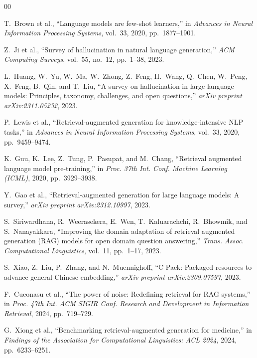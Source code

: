 \documentclass[conference]{IEEEtran}
\begin{document}
\begin{thebibliography}{00}

 T.~Brown et al., ``Language models are few-shot learners,'' in \textit{Advances in Neural Information Processing Systems}, vol.~33, 2020, pp.~1877--1901.

 Z.~Ji et al., ``Survey of hallucination in natural language generation,'' \textit{ACM Computing Surveys}, vol.~55, no.~12, pp.~1--38, 2023.

 L.~Huang, W.~Yu, W.~Ma, W.~Zhong, Z.~Feng, H.~Wang, Q.~Chen, W.~Peng, X.~Feng, B.~Qin, and T.~Liu, ``A survey on hallucination in large language models: Principles, taxonomy, challenges, and open questions,'' \textit{arXiv preprint arXiv:2311.05232}, 2023.

 P.~Lewis et al., ``Retrieval-augmented generation for knowledge-intensive NLP tasks,'' in \textit{Advances in Neural Information Processing Systems}, vol.~33, 2020, pp.~9459--9474.

 K.~Guu, K.~Lee, Z.~Tung, P.~Pasupat, and M.~Chang, ``Retrieval augmented language model pre-training,'' in \textit{Proc. 37th Int. Conf. Machine Learning (ICML)}, 2020, pp.~3929--3938.

 Y.~Gao et al., ``Retrieval-augmented generation for large language models: A survey,'' \textit{arXiv preprint arXiv:2312.10997}, 2023.

 S.~Siriwardhana, R.~Weerasekera, E.~Wen, T.~Kaluarachchi, R.~Bhowmik, and S.~Nanayakkara, ``Improving the domain adaptation of retrieval augmented generation (RAG) models for open domain question answering,'' \textit{Trans. Assoc. Computational Linguistics}, vol.~11, pp.~1--17, 2023.

 S.~Xiao, Z.~Liu, P.~Zhang, and N.~Muennighoff, ``C-Pack: Packaged resources to advance general Chinese embedding,'' \textit{arXiv preprint arXiv:2309.07597}, 2023.

 F.~Cuconasu et al., ``The power of noise: Redefining retrieval for RAG systems,'' in \textit{Proc. 47th Int. ACM SIGIR Conf. Research and Development in Information Retrieval}, 2024, pp.~719--729.

 G.~Xiong et al., ``Benchmarking retrieval-augmented generation for medicine,'' in \textit{Findings of the Association for Computational Linguistics: ACL 2024}, 2024, pp.~6233--6251.


\end{thebibliography}
\end{document}
